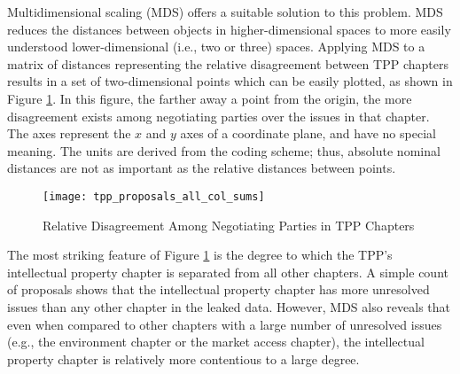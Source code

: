 \documentclass[12pt]{article}
\begin{document}
Multidimensional scaling (MDS) offers a suitable solution to this problem. MDS reduces the distances 
between 
objects in higher-dimensional spaces to more easily understood lower-dimensional (i.e., two or three) 
spaces. Applying MDS to a matrix of distances representing the relative disagreement between TPP chapters results in a set of 
two-dimensional 
points which can be easily plotted, as shown in Figure \ref{fig_tpp_chapters}. In this figure, the farther away a point from the origin, the more disagreement 
exists among negotiating parties over the issues in that chapter.
The axes represent the $x$ and $y$ axes of a 
coordinate plane, and have no special meaning. The units are derived from the coding scheme; thus, 
absolute nominal distances are not as important as the relative distances between points.

\begin{figure}
\caption{Relative Disagreement Among Negotiating Parties in TPP Chapters}
\label{fig_tpp_chapters}
\centering
\texttt{[image: tpp\_proposals\_all\_col\_sums]}
\end{figure}

The most striking feature of Figure \ref{fig_tpp_chapters} is the degree to which the TPP's 
intellectual property chapter 
is separated from all other chapters. A simple count of proposals shows that the intellectual property 
chapter has more unresolved issues than any other chapter in the leaked data. However, MDS 
also reveals that even when compared to other chapters with a large number of unresolved 
issues (e.g., the environment chapter or the market access chapter), the intellectual property chapter 
is relatively more contentious to a large degree.
\end{document}
